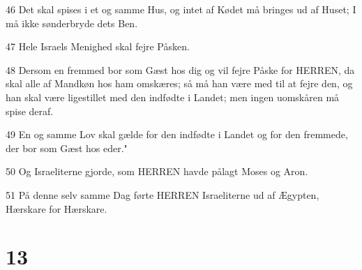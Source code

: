 \par 46 Det skal spises i et og samme Hus, og intet af Kødet må bringes ud af Huset; I må ikke sønderbryde dets Ben.
\par 47 Hele Israels Menighed skal fejre Påsken.
\par 48 Dersom en fremmed bor som Gæst hos dig og vil fejre Påske for HERREN, da skal alle af Mandkøn hos ham omskæres; så må han være med til at fejre den, og han skal være ligestillet med den indfødte i Landet; men ingen uomskåren må spise deraf.
\par 49 En og samme Lov skal gælde for den indfødte i Landet og for den fremmede, der bor som Gæst hos eder."
\par 50 Og Israeliterne gjorde, som HERREN havde pålagt Moses og Aron.
\par 51 På denne selv samme Dag førte HERREN Israeliterne ud af Ægypten, Hærskare for Hærskare.

\chapter{13}

